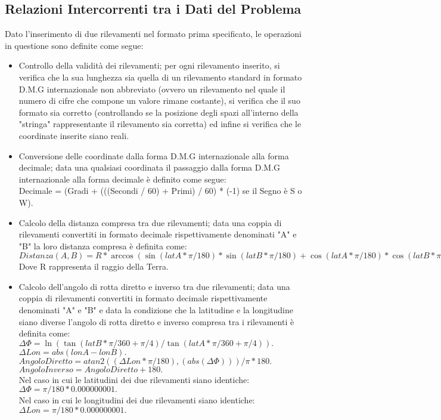 \documentclass{article}
\begin{document}
\subsection{Relazioni Intercorrenti tra i Dati del Problema}
Dato l'inserimento di due rilevamenti nel formato prima specificato, le operazioni in questione sono definite come segue:
\begin{itemize}
	\item Controllo della validità dei rilevamenti; per ogni rilevamento inserito, si verifica che la sua lunghezza sia quella di un rilevamento standard in formato D.M.G internazionale non abbreviato (ovvero un rilevamento nel quale il numero di cifre che compone un valore rimane costante), si verifica che il suo formato sia corretto (controllando se la posizione degli spazi all'interno della "stringa" rappresentante il rilevamento sia corretta) ed infine si verifica che le coordinate inserite siano reali. 
	
	\item Conversione delle coordinate dalla forma D.M.G internazionale alla forma decimale; data una qualsiasi coordinata il passaggio dalla forma D.M.G internazionale alla forma decimale è definito come segue: \\
	Decimale = (Gradi + (((Secondi / 60) + Primi) / 60) * (-1) se il Segno è  S o W).
	
	\item Calcolo della distanza compresa tra due rilevamenti;  data una coppia di rilevamenti convertiti in formato decimale rispettivamente denominati "A" e "B" la loro distanza compresa è definita come: \\
	$Distanza(A, B) = R * \arccos(\sin(latA * \pi / 180) * \sin(latB * \pi / 180) + \cos(latA * \pi / 180) * \cos(latB * \pi / 180) * \cos((lonA - lonB) * \pi / 180)). $\\
	Dove R rappresenta il raggio della Terra.
	
	\item Calcolo dell'angolo di rotta diretto e inverso tra due rilevamenti; data una coppia di rilevamenti convertiti in formato decimale rispettivamente denominati "A" e "B" e data la condizione che la latitudine e la longitudine siano diverse l'angolo di rotta diretto e inverso compresa tra i rilevamenti è definita come: \\
	$\Delta\Phi = \ln( \tan(latB * \pi / 360 + \pi / 4 ) / \tan(latA * \pi / 360 + \pi / 4 )). $\\
	$ \Delta Lon = abs(lonA - lonB). $ \\
	$ Angolo Diretto = atan2((\Delta Lon * \pi / 180), (abs(\Delta\Phi))) / \pi * 180. $\\
	$ Angolo Inverso = Angolo Diretto + 180.$\\
	Nel caso in cui le latitudini dei due rilevamenti siano identiche:\\
	$\Delta\Phi = \pi / 180 * 0.000000001.$\\
	Nel caso in cui le longitudini dei due rilevamenti siano identiche:\\
	$\Delta Lon = \pi / 180 * 0.000000001.$\\
\end{itemize}
\newpage
\end{document}
